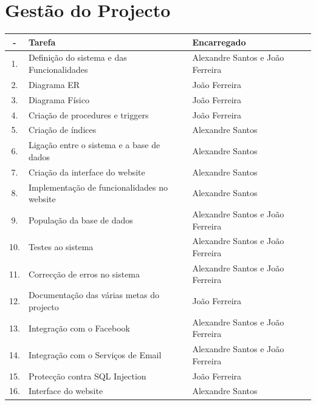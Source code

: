 \documentclass[a4paper, 12pt]{article}
\begin{document}
\section{Gestão do Projecto}
\begin{center}
    \begin{tabular}{| c | p{8cm} | p{6cm} |} \hline
        \-- &   \textbf{Tarefa}                             &   \textbf{Encarregado}\\ \hline
        1.  &   Definição do sistema e das Funcionalidades  &   Alexandre Santos e João Ferreira\\ \hline
        2.  &   Diagrama ER                                 &   João Ferreira\\ \hline
        3.  &   Diagrama Físico                             &   João Ferreira\\ \hline
        4.  &   Criação de procedures e triggers            &   João Ferreira\\ \hline
        5.  &   Criação de índices                          &   Alexandre Santos\\ \hline
        6.  &   Ligação entre o sistema e a base de dados   &   Alexandre Santos\\ \hline
        7.  &   Criação da interface do website             &   Alexandre Santos\\ \hline
        8.  &   Implementação de funcionalidades no website &   Alexandre Santos\\ \hline
        9.  &   População da base de dados                  &   Alexandre Santos e João Ferreira\\ \hline
        10. &   Testes ao sistema                           &   Alexandre Santos e João Ferreira\\ \hline
        11. &   Correcção de erros no sistema               &   Alexandre Santos e João Ferreira\\ \hline
        12. &   Documentação das várias metas do projecto   &   João Ferreira\\ \hline
        13. &   Integração com o Facebook                   &   Alexandre Santos e João Ferreira\\ \hline
        14. &   Integração com o Serviços de Email          &   Alexandre Santos e João Ferreira\\ \hline
        15. &   Protecção contra SQL Injection              &   João Ferreira\\ \hline
        16. &   Interface do website                        &   Alexandre Santos\\ \hline
    \end{tabular}
\end{center}
\cleardoublepage
\end{document}
